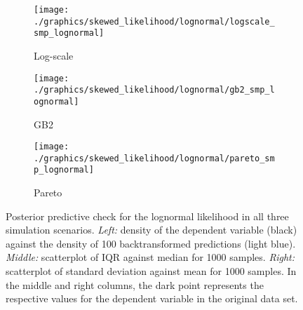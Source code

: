 \begin{figure}
    \begin{subfigure}{\textwidth}
        \texttt{[image: ./graphics/skewed\_likelihood/lognormal/logscale\_smp\_lognormal]}
        \caption{Log-scale}
    \end{subfigure}
    \newline
    \begin{subfigure}{\textwidth}
        \texttt{[image: ./graphics/skewed\_likelihood/lognormal/gb2\_smp\_lognormal]}
        \caption{GB2}
    \end{subfigure}
    \newline
    \begin{subfigure}{\textwidth}
        \texttt{[image: ./graphics/skewed\_likelihood/lognormal/pareto\_smp\_lognormal]}
        \caption{Pareto}
    \end{subfigure}
    \caption[Posterior predictive check for the lognormal likelihood in all three simulation scenarios.]{Posterior predictive check for the lognormal likelihood in all three simulation scenarios. \textit{Left:} density of the dependent variable (black) against the  density of 100 backtransformed predictions (light blue). \textit{Middle:} scatterplot of IQR against median for 1000 samples. \textit{Right:} scatterplot of standard deviation against mean for 1000 samples. In the middle and right columns, the dark point represents the respective values for the dependent variable in the original data set.}
    \label{fig:ppc_lognormal}
\end{figure}

